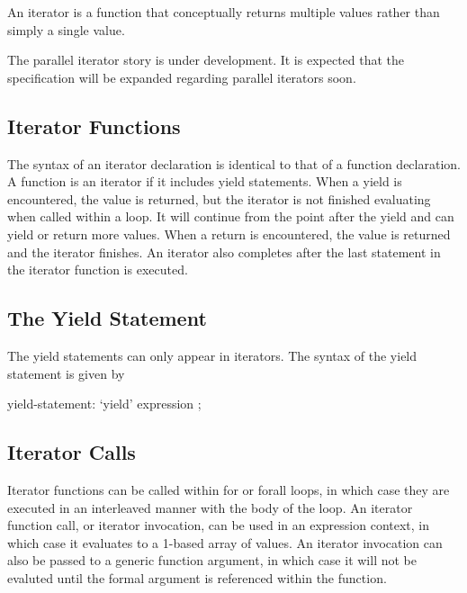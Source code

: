 \label{Iterators}

An iterator is a function that conceptually returns multiple values
rather than simply a single value.

\begin{openissue}
The parallel iterator story is under development.  It is expected that
the specification will be expanded regarding parallel iterators soon.
\end{openissue}

\subsection{Iterator Functions}
\label{Iterator_Functions}

The syntax of an iterator declaration is identical to that of a
function declaration.  A function is an iterator if it includes yield
statements.  When a yield is encountered, the value is returned, but
the iterator is not finished evaluating when called within a loop.  It
will continue from the point after the yield and can yield or return
more values.  When a return is encountered, the value is returned and
the iterator finishes.  An iterator also completes after the last
statement in the iterator function is executed.

\subsection{The Yield Statement}
\label{The_Yield_Statement}

The yield statements can only appear in iterators.  The syntax of the
yield statement is given by
\begin{syntax}
yield-statement:
  `yield' expression ;
\end{syntax}

\subsection{Iterator Calls}
\label{Iterator_Calls}

Iterator functions can be called within for or forall loops, in which
case they are executed in an interleaved manner with the body of the
loop. An iterator function call, or iterator invocation, can be used in an expression context, in which
case it evaluates to a 1-based array of values. 
An iterator invocation can also be passed to a
generic function argument, in which case it will not be evaluted until
the formal argument is referenced within the function.

